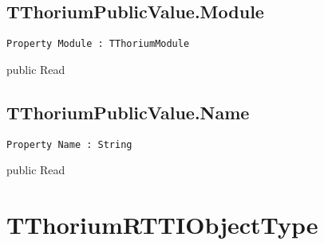 \subsection{TThoriumPublicValue.Module}
\label{thoriumcore:thorium:tthoriumpublicvalue:module}
\begin{FPCList}
\Synopsis
\Declaration 

\begin{verbatim}
Property Module : TThoriumModule
\end{verbatim}
\Visibility
public
\Access
Read
\Description
\end{FPCList}
\subsection{TThoriumPublicValue.Name}
\label{thoriumcore:thorium:tthoriumpublicvalue:name}
\begin{FPCList}
\Synopsis
\Declaration 

\begin{verbatim}
Property Name : String
\end{verbatim}
\Visibility
public
\Access
Read
\Description
\end{FPCList}
\section{TThoriumRTTIObjectType}
\label{thoriumcore:thorium:tthoriumrttiobjecttype}
